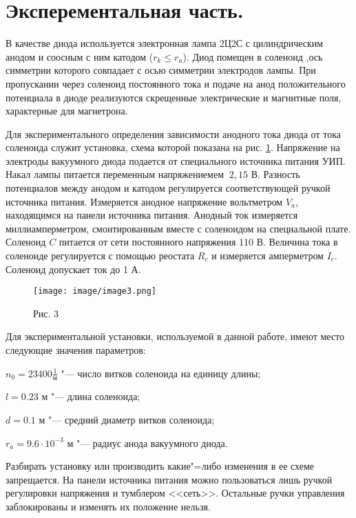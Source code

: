 \section{Эксперементальная часть.}

В качестве диода используется электронная лампа 2Ц2С с цилиндрическим анодом и соосным с ним катодом ($r_k \leq r_a$). Диод помещен в соленоид ,ось симметрии которого совпадает с осью симметрии электродов лампы. При пропускании через соленоид постоянного тока и подаче на анод положительного потенциала в диоде реализуются скрещенные электрические и магнитные поля, характерные для магнетрона. 

Для экспериментального определения зависимости анодного тока диода от тока соленоида служит установка, схема которой показана на рис. \ref{fig:image3}. Напряжение на электроды вакуумного диода подается от специального источника питания УИП. Накал лампы питается переменным напряжениемем $~ 2,15$ В. Разность потенциалов между анодом и катодом регулируется соответствующей ручкой источника питания. Измеряется анодное напряжение вольтметром $V_a$, находящимся на панели источника питания. Анодный ток измеряется миллиамперметром, смонтированным вместе с соленоидом на специальной плате. Соленоид $C$ питается от сети постоянного напряжения 110 В. Величина тока в соленоиде регулируется с помощью реостата $R_c$ и измеряется амперметром $I_c$. Соленоид допускает ток до 1 А.

\begin{figure}[!h]
    \centering
    \texttt{[image: image/image3.png]}
    \caption{Рис. 3}
    \label{fig:image3}
\end{figure}

Для экспериментальной установки, используемой в данной работе, имеют место следующие значения параметров:

$n_0 = 23400 \frac{1}{\text{м}}$ "--- число витков соленоида на единицу длины;

$l = 0.23$ м "--- длина соленоида;

$d = 0.1$ м "--- средний диаметр витков соленоида;

$r_a = 9.6 \cdot 10^{-3}$ м "--- радиус анода вакуумного диода.

Разбирать установку или производить какие"=либо изменения в ее схеме запрещается. На панели источника питания можно пользоваться лишь ручкой регулировки напряжения и тумблером <<сеть>>. Остальные ручки управления заблокированы и изменять их положение нельзя.

